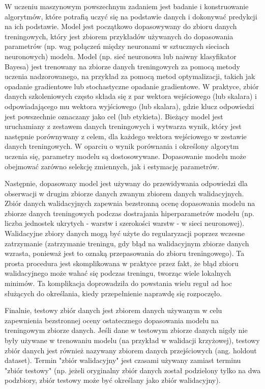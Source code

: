 \documentclass[polish, twoside, 12pt, a4paper]{article}
\theoremstyle{definition}
\theoremstyle{plain}
\theoremstyle{remark}
\begin{document}
W uczeniu maszynowym powszechnym zadaniem jest badanie i konstruowanie algorytmów, które potrafią uczyć się na podstawie danych i dokonywać predykcji na ich podstawie. \cite{kohavi1998} Model jest początkowo dopasowywany do zbioru danych treningowych, który jest zbiorem przykładów używanych do dopasowania parametrów (np. wag połączeń między neuronami w sztucznych sieciach neuronowych) modelu. Model (np. sieć neuronowa lub naiwny klasyfikator Bayesa) jest trenowany na zbiorze danych treningowych za pomocą metody uczenia nadzorowanego, na przykład za pomocą metod optymalizacji, takich jak opadanie gradientowe lub stochastyczne opadanie gradientowe. W praktyce, zbiór danych szkoleniowych często składa się z par wektora wejściowego (lub skalara) i odpowiadającego mu wektora wyjściowego (lub skalara), gdzie klucz odpowiedzi jest powszechnie oznaczany jako cel (lub etykieta). Bieżący model jest uruchamiany z zestawem danych treningowych i wytwarza wynik, który jest następnie porównywany z celem, dla każdego wektora wejściowego w zestawie danych treningowych. W oparciu o wynik porównania i określony algorytm uczenia się, parametry modelu są dostosowywane. Dopasowanie modelu może obejmować zarówno selekcję zmiennych, jak i estymację parametrów.

Następnie, dopasowany model jest używany do przewidywania odpowiedzi dla obserwacji w drugim zbiorze danych zwanym zbiorem danych walidacyjnych. Zbiór danych walidacyjnych zapewnia bezstronną ocenę dopasowania modelu na zbiorze danych treningowych podczas dostrajania hiperparametrów modelu (np. liczba jednostek ukrytych - warstw i szerokości warstw - w sieci neuronowej). Walidacyjne zbiory danych mogą być użyte do regularyzacji poprzez wczesne zatrzymanie (zatrzymanie treningu, gdy błąd na walidacyjnym zbiorze danych wzrasta, ponieważ jest to oznaką przepasowania do zbioru treningowego). Ta prosta procedura jest skomplikowana w praktyce przez fakt, że błąd zbioru walidacyjnego może wahać się podczas treningu, tworząc wiele lokalnych minimów. Ta komplikacja doprowadziła do powstania wielu reguł ad hoc służących do określania, kiedy przepełnienie naprawdę się rozpoczęło.

Finalnie, testowy zbiór danych jest zbiorem danych używanym w celu zapewnienia bezstronnej oceny ostatecznego dopasowania modelu na treningowym zbiorze danych. Jeśli dane w testowym zbiorze danych nigdy nie były używane w trenowaniu modelu (na przykład w walidacji krzyżowej), testowy zbiór danych jest również nazywany zbiorem danych przejściowych (ang. holdout dataset). Termin "zbiór walidacyjny" jest czasami używany zamiast terminu "zbiór testowy" (np. jeżeli oryginalny zbiór danych został podzielony tylko na dwa podzbiory, zbiór testowy może być określany jako zbiór walidacyjny).\cite{brownlee2017}
\end{document}
